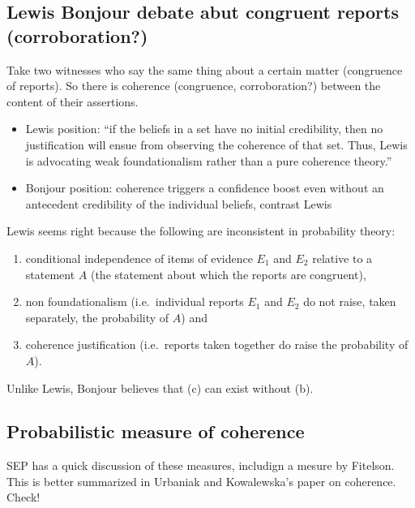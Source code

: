 \documentclass[
  11pt,
  dvipsnames,enabledeprecatedfontcommands]{scrartcl}
\begin{document}
\hypertarget{lewis-bonjour-debate-abut-congruent-reports-corroboration}{%
\subsection{Lewis Bonjour debate abut congruent reports
(corroboration?)}\label{lewis-bonjour-debate-abut-congruent-reports-corroboration}}

Take two witnesses who say the same thing about a certain matter
(congruence of reports). So there is coherence (congruence,
corroboration?) between the content of their assertions.

\begin{itemize}
\item
  Lewis position: ``if the beliefs in a set have no initial credibility,
  then no justification will ensue from observing the coherence of that
  set. Thus, Lewis is advocating weak foundationalism rather than a pure
  coherence theory.''
\item
  Bonjour position: coherence triggers a confidence boost even without
  an antecedent credibility of the individual beliefs, contrast Lewis
\end{itemize}

Lewis seems right because the following are inconsistent in probability
theory:

\begin{enumerate}
\def\labelenumi{(\alph{enumi})}
\item
  conditional independence of items of evidence \(E_1\) and \(E_2\)
  relative to a statement \(A\) (the statement about which the reports
  are congruent),
\item
  non foundationalism (i.e.~individual reports \(E_1\) and \(E_2\) do
  not raise, taken separately, the probability of \(A\)) and
\item
  coherence justification (i.e.~reports taken together do raise the
  probability of \(A\)).
\end{enumerate}

Unlike Lewis, Bonjour believes that (c) can exist without (b).

\hypertarget{probabilistic-measure-of-coherence}{%
\subsection{Probabilistic measure of
coherence}\label{probabilistic-measure-of-coherence}}

SEP has a quick discussion of these measures, includign a mesure by
Fitelson. This is better summarized in Urbaniak and Kowalewska's paper
on coherence. Check!
\end{document}
